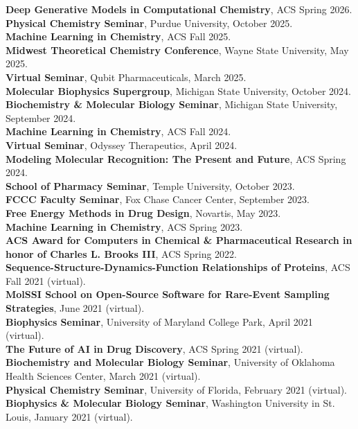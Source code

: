 \documentclass[margin,line]{res}
\begin{document}
\begin{resume}
{\bf Deep Generative Models in Computational Chemistry}, ACS Spring 2026.\\
{\bf Physical Chemistry Seminar}, Purdue University, October 2025.\\
{\bf Machine Learning in Chemistry}, ACS Fall 2025.\\
{\bf Midwest Theoretical Chemistry Conference}, Wayne State University, May 2025.\\
{\bf Virtual Seminar}, Qubit Pharmaceuticals, March 2025.\\
{\bf Molecular Biophysics Supergroup}, Michigan State University, October 2024.\\
{\bf Biochemistry \& Molecular Biology Seminar}, Michigan State University, September 2024.\\
{\bf Machine Learning in Chemistry}, ACS Fall 2024.\\
{\bf Virtual Seminar}, Odyssey Therapeutics, April 2024.\\
{\bf Modeling Molecular Recognition: The Present and Future}, ACS Spring 2024.\\
{\bf School of Pharmacy Seminar}, Temple University, October 2023. \\
{\bf FCCC Faculty Seminar}, Fox Chase Cancer Center, September 2023. \\
{\bf Free Energy Methods in Drug Design}, Novartis, May 2023. \\
{\bf Machine Learning in Chemistry}, ACS Spring 2023.\\
{\bf ACS Award for Computers in Chemical \& Pharmaceutical Research in honor of Charles L. Brooks III}, ACS Spring 2022.\\
{\bf Sequence-Structure-Dynamics-Function Relationships of Proteins}, ACS Fall 2021 (virtual).\\
{\bf MolSSI School on Open-Source Software for Rare-Event Sampling Strategies}, June 2021 (virtual).\\
{\bf Biophysics Seminar}, University of Maryland College Park, April 2021 (virtual).\\
{\bf The Future of AI in Drug Discovery}, ACS Spring 2021 (virtual).\\
{\bf Biochemistry and Molecular Biology Seminar}, University of Oklahoma Health Sciences Center, March 2021 (virtual).\\
{\bf Physical Chemistry Seminar}, University of Florida, February 2021 (virtual).\\
{\bf Biophysics \& Molecular Biology Seminar}, Washington University in St. Louis, January 2021 (virtual).\\

\end{resume}
\end{document}
